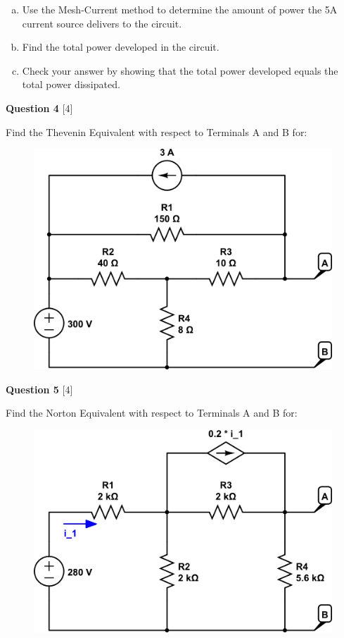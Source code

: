 \documentclass[12pt]{article}
\begin{document}
\begin{enumerate}[(a)]
\item Use the Mesh-Current method to determine the amount of power the 5A current source delivers to the circuit.
\item Find the total power developed in the circuit.
\item Check your answer by showing that the total power developed equals the total power dissipated.
\end{enumerate}

{\bf Question 4} [4] %

Find the Thevenin Equivalent with respect to Terminals A and B for:

\begin{figure}[h!]
\begin{center}
 \includegraphics[scale=0.4]{fig4_67.png}
\end{center}
\end{figure}

\newpage

{\bf Question 5} [4] %

Find the Norton Equivalent with respect to Terminals A and B for:

\begin{figure}[h!]
\begin{center}
 \includegraphics[scale=0.4]{fig4_75.png}
\end{center}
\end{figure}


 
\end{document}
